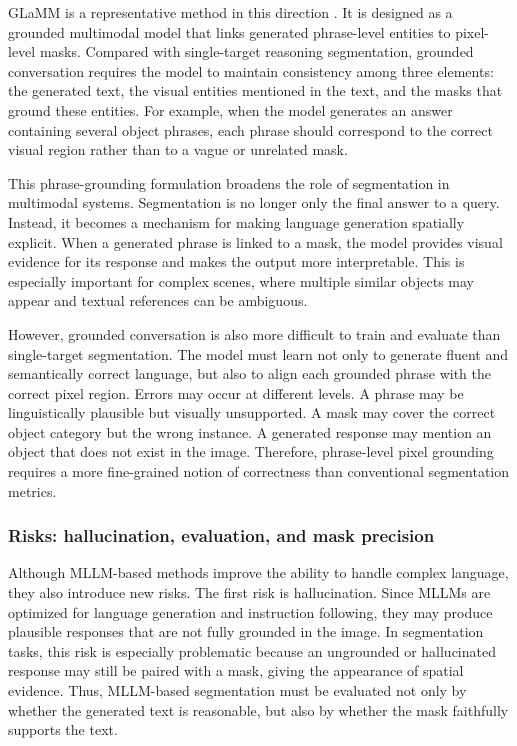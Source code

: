 GLaMM is a representative method in this direction \cite{Rasheed2024}. 
It is designed as a grounded multimodal model that links generated phrase-level entities to pixel-level masks. 
Compared with single-target reasoning segmentation, grounded conversation requires the model to maintain consistency among three elements: the generated text, the visual entities mentioned in the text, and the masks that ground these entities. 
For example, when the model generates an answer containing several object phrases, each phrase should correspond to the correct visual region rather than to a vague or unrelated mask.

This phrase-grounding formulation broadens the role of segmentation in multimodal systems. 
Segmentation is no longer only the final answer to a query. 
Instead, it becomes a mechanism for making language generation spatially explicit. 
When a generated phrase is linked to a mask, the model provides visual evidence for its response and makes the output more interpretable. 
This is especially important for complex scenes, where multiple similar objects may appear and textual references can be ambiguous.

However, grounded conversation is also more difficult to train and evaluate than single-target segmentation. 
The model must learn not only to generate fluent and semantically correct language, but also to align each grounded phrase with the correct pixel region. 
Errors may occur at different levels. 
A phrase may be linguistically plausible but visually unsupported. 
A mask may cover the correct object category but the wrong instance. 
A generated response may mention an object that does not exist in the image. 
Therefore, phrase-level pixel grounding requires a more fine-grained notion of correctness than conventional segmentation metrics.

\subsubsection{Risks: hallucination, evaluation, and mask precision}

Although MLLM-based methods improve the ability to handle complex language, they also introduce new risks. 
The first risk is hallucination. 
Since MLLMs are optimized for language generation and instruction following, they may produce plausible responses that are not fully grounded in the image. 
In segmentation tasks, this risk is especially problematic because an ungrounded or hallucinated response may still be paired with a mask, giving the appearance of spatial evidence. 
Thus, MLLM-based segmentation must be evaluated not only by whether the generated text is reasonable, but also by whether the mask faithfully supports the text.

